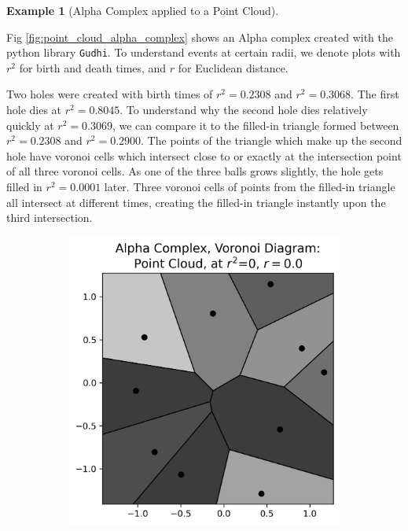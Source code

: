 \documentclass[ma]{uncgdissertationexp}
\theoremstyle{plain}
\theoremstyle{definition}
\newtheorem{example}[theorem]{Example}
\theoremstyle{remark}
\begin{document}
\newpage
\begin{example}[Alpha Complex applied to a Point Cloud]\label{ex:point_cloud_alpha}
\par Fig \ref{fig:point_cloud_alpha_complex} shows an Alpha complex created with the python library \verb"Gudhi". To understand events at certain radii, we denote plots with $r^{2}$ for birth and death times, and $r$ for Euclidean distance.
\par Two holes were created with birth times of $r^{2}=0.2308$ and $r^{2}=0.3068$. The first hole dies at $r^{2}=0.8045$. To understand why the second hole dies relatively quickly at $r^{2}=0.3069$, we can compare it to the filled-in triangle formed between $r^{2} = 0.2308$ and $r^{2} = 0.2900$. The points of the triangle which make up the second hole have voronoi cells which intersect close to or exactly at the intersection point of all three voronoi cells. As one of the three balls grows slightly, the hole gets filled in $r^{2}=0.0001$ later. Three voronoi cells of points from the filled-in triangle all intersect at different times, creating the filled-in triangle instantly upon the third intersection.
\begin{figure}[H]
    \centering
    \begin{subfigure}[b]{0.27\textwidth}
        \includegraphics[width=\textwidth]{point_cloud_plot_alpha_0.png}

\end{subfigure}
\end{figure}
\end{example}
\end{document}
